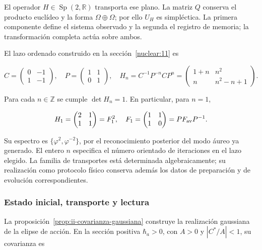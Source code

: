 El operador \(H\in\operatorname{Sp}(2,\mathbb R)\) transporta ese plano. La matriz \(Q\) conserva el producto euclídeo y la forma \(\Omega\oplus\Omega\); por ello \(U_H\) es simpléctica. La primera componente define el sistema observado y la segunda el registro de memoria; la transformación completa actúa sobre ambos.

El lazo ordenado construido en la sección~\ref{nuclear:11} es



\begin{equation}
C=\begin{pmatrix}0&-1\\1&-1\end{pmatrix},\quad
P=\begin{pmatrix}1&1\\0&1\end{pmatrix},\quad
H_n=C^{-1}P^{-n}CP^n
=\begin{pmatrix}1+n&n^2\\n&n^2-n+1\end{pmatrix}.
\label{nuc12:eq:5.2}
\end{equation}



Para cada \(n\in\mathbb Z\) se cumple \(\det H_n=1\). En particular, para \(n=1\),


\begin{equation}
H_1=\begin{pmatrix}2&1\\1&1\end{pmatrix}
=F_1^2,\quad F_1=\begin{pmatrix}1&1\\1&0\end{pmatrix}
=P F_{\rm av}P^{-1}.
\label{nuc12:eq:5.3}
\end{equation}



Su espectro es \(\{\varphi^2,\varphi^{-2}\}\), por el reconocimiento posterior del modo áureo ya generado. El entero \(n\) especifica el número orientado de iteraciones en el lazo elegido. La familia de transportes está determinada algebraicamente; su realización como protocolo físico conserva además los datos de preparación y de evolución correspondientes.

\subsubsection{Estado inicial, transporte y lectura}

La proposición~\ref{prop:ii-covarianza-gaussiana} construye la realización gaussiana de la elipse de acción. En la sección positiva \(\hbar_a>0\), con \(A>0\) y \(|C^*/A|<1\), su covarianza es



